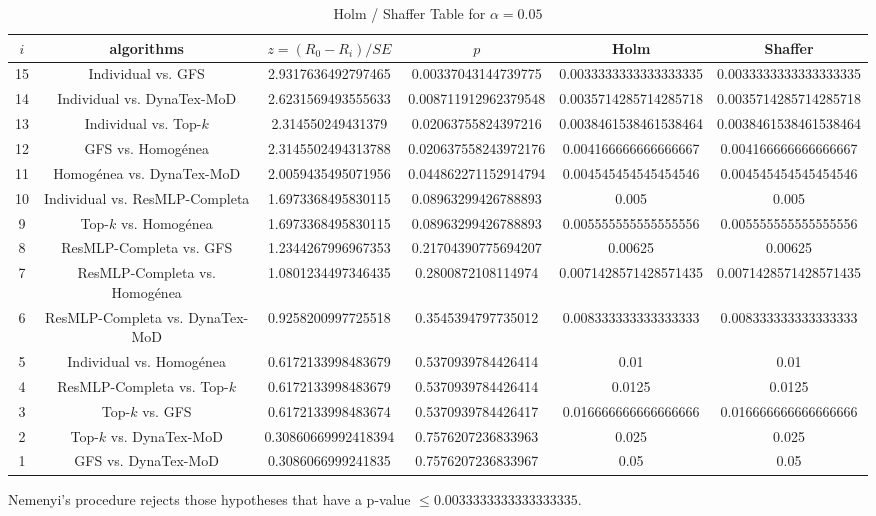 \documentclass[a4paper,10pt]{article}
\begin{document}
\begin{landscape}
\begin{table}[!htp]
\centering\tiny
\caption{Holm / Shaffer Table for $\alpha=0.05$}
\begin{tabular}{cccccc}
$i$&algorithms&$z=(R_0 - R_i)/SE$&$p$&Holm&Shaffer\\
\hline
15&Individual vs. GFS&2.9317636492797465&0.00337043144739775&0.0033333333333333335&0.0033333333333333335\\
14&Individual vs. DynaTex-MoD&2.6231569493555633&0.008711912962379548&0.0035714285714285718&0.0035714285714285718\\
13&Individual vs. Top-$k$&2.314550249431379&0.02063755824397216&0.0038461538461538464&0.0038461538461538464\\
12&GFS vs. Homogénea&2.3145502494313788&0.020637558243972176&0.004166666666666667&0.004166666666666667\\
11&Homogénea vs. DynaTex-MoD&2.0059435495071956&0.044862271152914794&0.004545454545454546&0.004545454545454546\\
10&Individual vs. ResMLP-Completa&1.6973368495830115&0.08963299426788893&0.005&0.005\\
9&Top-$k$ vs. Homogénea&1.6973368495830115&0.08963299426788893&0.005555555555555556&0.005555555555555556\\
8&ResMLP-Completa vs. GFS&1.2344267996967353&0.21704390775694207&0.00625&0.00625\\
7&ResMLP-Completa vs. Homogénea&1.0801234497346435&0.2800872108114974&0.0071428571428571435&0.0071428571428571435\\
6&ResMLP-Completa vs. DynaTex-MoD&0.9258200997725518&0.3545394797735012&0.008333333333333333&0.008333333333333333\\
5&Individual vs. Homogénea&0.6172133998483679&0.5370939784426414&0.01&0.01\\
4&ResMLP-Completa vs. Top-$k$&0.6172133998483679&0.5370939784426414&0.0125&0.0125\\
3&Top-$k$ vs. GFS&0.6172133998483674&0.5370939784426417&0.016666666666666666&0.016666666666666666\\
2&Top-$k$ vs. DynaTex-MoD&0.30860669992418394&0.7576207236833963&0.025&0.025\\
1&GFS vs. DynaTex-MoD&0.3086066999241835&0.7576207236833967&0.05&0.05\\
\hline
\end{tabular}
\end{table}
Nemenyi's procedure rejects those hypotheses that have a p-value $\le0.0033333333333333335$.



\end{landscape}
\end{document}
